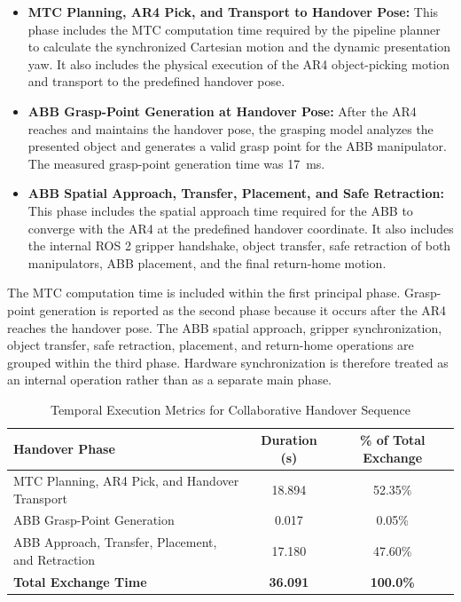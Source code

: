 \begin{itemize}
    \item \textbf{MTC Planning, AR4 Pick, and Transport to Handover Pose:} This phase includes the MTC computation time required by the pipeline planner to calculate the synchronized Cartesian motion and the dynamic presentation yaw. It also includes the physical execution of the AR4 object-picking motion and transport to the predefined handover pose.
    \item \textbf{ABB Grasp-Point Generation at Handover Pose:} After the AR4 reaches and maintains the handover pose, the grasping model analyzes the presented object and generates a valid grasp point for the ABB manipulator. The measured grasp-point generation time was 17~ms.
    \item \textbf{ABB Spatial Approach, Transfer, Placement, and Safe Retraction:} This phase includes the spatial approach time required for the ABB to converge with the AR4 at the predefined handover coordinate. It also includes the internal ROS 2 gripper handshake, object transfer, safe retraction of both manipulators, ABB placement, and the final return-home motion.
\end{itemize}

The MTC computation time is included within the first principal phase. Grasp-point generation is reported as the second phase because it occurs after the AR4 reaches the handover pose. The ABB spatial approach, gripper synchronization, object transfer, safe retraction, placement, and return-home operations are grouped within the third phase. Hardware synchronization is therefore treated as an internal operation rather than as a separate main phase.

\begin{table}[H]
    \centering
    \caption{Temporal Execution Metrics for Collaborative Handover Sequence}
    \label{tab:handover_metrics}
    \begin{tabular}{lcc}
        \toprule
        \textbf{Handover Phase} & \textbf{Duration (s)} & \textbf{\% of Total Exchange} \\
        \midrule
        MTC Planning, AR4 Pick, and Handover Transport & 18.894 & 52.35\% \\
        ABB Grasp-Point Generation & 0.017 & 0.05\% \\
        ABB Approach, Transfer, Placement, and Retraction & 17.180 & 47.60\% \\
        \midrule
        \textbf{Total Exchange Time} & \textbf{36.091} & \textbf{100.0\%} \\
        \bottomrule
    \end{tabular}
\end{table}

